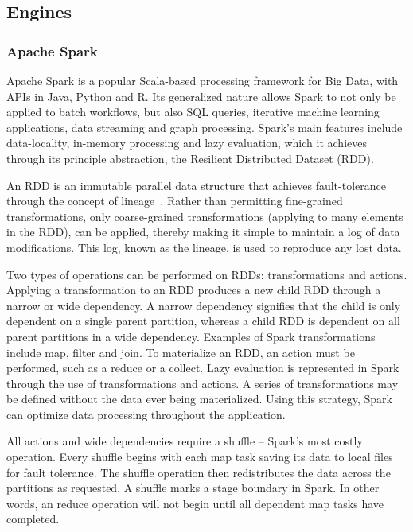 \documentclass{IEEEtran}
\newcommand{\todo}[1]{\marginpar{\parbox{18mm}{\flushleft\tiny\color{red}\textbf{TODO}:
      #1}}}
\begin{document}
\subsection{Engines} %

\subsubsection{Apache Spark}

Apache Spark is a popular Scala-based processing framework for Big Data, with
APIs in Java, Python and R. Its 
generalized nature allows Spark to not only be applied to batch workflows,
but also SQL queries, iterative machine learning applications, 
data streaming and graph processing. Spark's
main features include data-locality, in-memory processing and lazy evaluation,
which it achieves through its principle abstraction, the Resilient Distributed 
Dataset (RDD). 

An RDD is an immutable parallel data structure that achieves fault-tolerance 
through the concept of lineage~\cite{zaharia2010spark}. Rather than permitting
fine-grained transformations, only coarse-grained transformations (applying to
many elements in the RDD), can be applied, thereby making it simple to maintain a 
log of data modifications. This log, known as the lineage, is used
to reproduce any lost data.

Two types of operations can be performed on RDDs:
transformations and actions. Applying a transformation to an RDD produces a new
child RDD through a narrow or wide dependency. A narrow dependency signifies 
that the child is only dependent on a single parent partition, whereas a child 
RDD is dependent on all parent partitions in a wide dependency. Examples of 
Spark transformations include map, filter and join. To materialize an RDD, an
action must be performed, such as a reduce or a collect. Lazy evaluation is 
represented in Spark through the use of transformations and actions. A series of
transformations may be defined without the data ever being materialized. Using 
this strategy, Spark can optimize data processing
throughout the application.


All actions and wide dependencies require a shuffle -- Spark's most costly
operation. Every shuffle begins with each map task saving its data to local
files for fault tolerance. The shuffle operation then 
redistributes the data across the partitions as requested. A shuffle marks a 
stage boundary in Spark. In other words, an reduce operation  will not begin 
until all 
dependent map tasks have completed.
\end{document}

